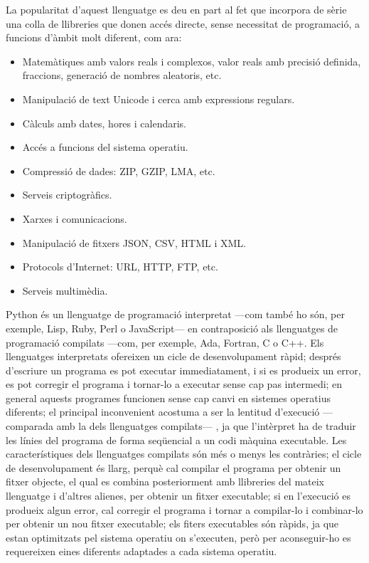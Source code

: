 La popularitat d'aquest llenguatge es deu en part al fet que incorpora de sèrie una colla de llibreries que donen accés directe, sense necessitat de programació, a funcions d'àmbit molt diferent, com ara:
\begin{itemize}
	\item  Matemàtiques amb valors reals i complexos, valor reals amb precisió definida, fraccions, generació de nombres aleatoris, etc.
	\item Manipulació de text Unicode i cerca amb expressions regulars.
	\item Càlculs amb dates, hores i calendaris.
	\item Accés a funcions del sistema operatiu.
	\item Compressió de dades: ZIP, GZIP, LMA, etc.
	\item Serveis criptogràfics.
	\item Xarxes i comunicacions.
	\item Manipulació de fitxers JSON, CSV, HTML i XML.
	\item Protocols d'Internet: URL, HTTP, FTP, etc.
	\item Serveis multimèdia.
\end{itemize}


Python és un llenguatge de programació interpretat ---com també ho són, per exemple,  Lisp, Ruby, Perl o JavaScript--- en contraposició als llenguatges de programació compilats ---com, per exemple, Ada, Fortran, C o C++. Els llenguatges interpretats ofereixen un cicle de desenvolupament ràpid; després d'escriure un programa es pot executar immediatament, i si es produeix  un error, es pot corregir el programa i tornar-lo a executar sense cap pas intermedi; en general aquests programes funcionen sense cap canvi en  sistemes operatius diferents; el principal inconvenient acostuma a ser la lentitud d'execució ---comparada amb la dels llenguatges compilats--- , ja que l'intèrpret ha de traduir les línies del programa de forma seqüencial a un codi màquina executable. Les característiques dels llenguatges compilats són més o menys les contràries; el cicle de desenvolupament és llarg, perquè cal compilar el programa per obtenir un fitxer objecte, el qual es combina posteriorment amb llibreries del mateix llenguatge i d'altres alienes, per obtenir un fitxer executable; si en l'execució es produeix algun error, cal corregir el programa i tornar a compilar-lo i combinar-lo per obtenir un nou fitxer executable; els fiters executables són ràpids, ja que estan optimitzats pel sistema operatiu on s'executen, però per aconseguir-ho  es requereixen eines diferents adaptades a cada sistema operatiu.

